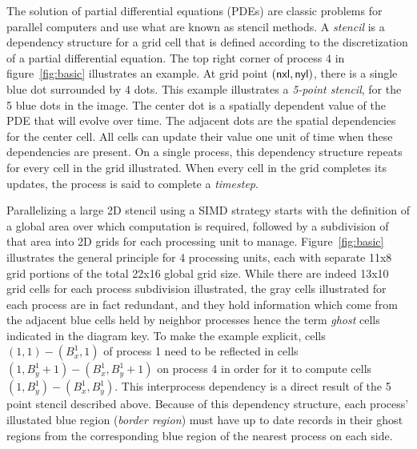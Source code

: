 The solution of partial differential equations (PDEs) are classic problems for parallel
computers and use
what are known as stencil methods.  A {\it stencil} is a dependency structure for a grid
cell that is defined according to the discretization of a partial differential equation.
The top right corner of process 4 in figure~\ref{fig:basic} illustrates an example.
At grid point $(\textup{\textsf{nxl}},\textup{\textsf{nyl}})$, there is a single blue dot surrounded by 4 dots.
This example illustrates
a {\it 5-point stencil}, for the 5 blue dots in the image.  The center dot is a spatially
dependent value of the PDE that will evolve over time.  The adjacent dots are the
spatial dependencies for the center cell.  All cells can update their value one unit of
time when these dependencies are present.  On a single process, this dependency structure
repeats for every cell in the grid illustrated.  When every cell in the grid
completes its updates, the process is said to complete a {\it timestep}.

Parallelizing a large 2D stencil using a SIMD
strategy starts with the definition of a global area over which
computation is required, followed by a subdivision of that area into 2D grids for each
processing unit to manage.  Figure~\ref{fig:basic} illustrates the general principle for 4 processing units,
each with separate
11x8 grid portions of the total 22x16 global grid size.  While there are indeed 13x10 grid cells for each
process subdivision illustrated, the gray cells illustrated for each process are in fact redundant, and they
hold information which come from the adjacent blue cells held by neighbor processes hence the term {\it ghost} cells
indicated in the diagram key.  To make the example explicit, cells $(1,1) - (B_x^1,1)$ of process 1 need to be
reflected in cells $(1,B_y^1+1) - (B_x^1, B_y^1+1)$ on process 4 in order for it to compute cells
$(1,B_y^1) - (B_x^1, B_y^1)$.
  This interprocess dependency is a direct result of the 5 point stencil described above.
  Because of this dependency structure, each process' illustated blue region
({\it border region}) must have up to date records in their ghost regions from the corresponding
 blue region of the nearest process on each side.

